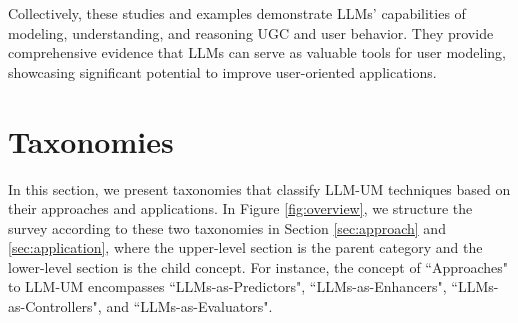 \documentclass[11pt]{article}
\newcommand{\edit}[1]{\textcolor{blue}{#1}}
\newcommand{\comments}[1]{\textcolor{red}{[Re:~#1]}}
\begin{document}
Collectively, these studies and examples demonstrate LLMs' capabilities of modeling, understanding, and reasoning UGC and user behavior. They provide comprehensive evidence that LLMs can serve as valuable tools for user modeling, showcasing significant potential to improve user-oriented applications.







\section{Taxonomies}
\label{sec:taxonomy}

In this section, we present taxonomies that classify LLM-UM techniques based on their approaches and applications.
In Figure \ref{fig:overview}, we structure the survey according to these two taxonomies in Section \ref{sec:approach} and \ref{sec:application}, where the upper-level section is the parent category and the lower-level section is the child concept. For instance, the concept of ``Approaches" to LLM-UM encompasses ``LLMs-as-Predictors", ``LLMs-as-Enhancers", ``LLMs-as-Controllers", and ``LLMs-as-Evaluators".
\end{document}
